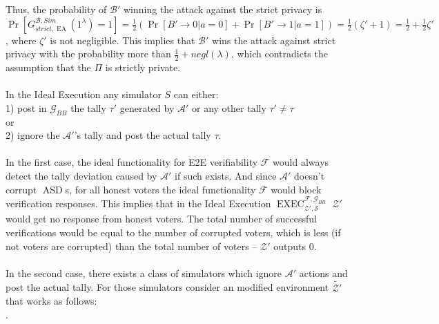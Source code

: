 \documentclass[12pt]{article}
\DeclareMathOperator{\exec}{EXEC}
\DeclareMathOperator{\asd}{ASD}
\DeclareMathOperator{\ea}{EA}
\begin{document}
%
Thus, the probability of $\mathcal{B'}$  winning the attack against the strict privacy is \\$\Pr[G_{strict,\ea}^{\mathcal{B}, Sim}(1^{\lambda})=1]= \frac{1}{2}(\Pr[B'\rightarrow 0| a=0] + \Pr[B'\rightarrow 1| a=1])  = \frac{1}{2} (\zeta' +1) =  \frac{1}{2}  +  \frac{1}{2} \zeta'$ , where $\zeta'$ is not negligible. This implies that $\mathcal{B'}$ wins the attack against strict privacy with the probability more than $\frac{1}{2} + negl(\lambda)$, which contradicts the assumption that the $\Pi$ is strictly private.\\\\
In the Ideal Execution any simulator $S$ can either:\\
1) post in $\mathcal{G}_{BB}$ the tally $\tau'$ generated by $\mathcal{A'}$ or any other tally  $\tau' \neq \tau$\\ 
or\\
2) ignore the $\mathcal{A'}$'s tally and post the actual tally $\tau$.\\\\
In the first case, the ideal functionality for E2E verifiability  $\mathcal{F}$  would always detect the tally deviation caused by $\mathcal{A'}$ if such exists. And since  $\mathcal{A'}$ doesn't corrupt $\asd$s, for all honest voters the ideal functionality $\mathcal{F}$ would block verification responses. This implies that in the Ideal Execution $\exec_{\mathcal{Z'}, \mathcal{S}}^{\mathcal{F}, \mathcal{G}_{BB}}$ $\mathcal{Z'}$ would get no response from honest voters. The total number of successful verifications would be equal to the number of corrupted voters, which is less (if not voters are corrupted) than the total number of voters -- $\mathcal{Z'}$ outputs 0.  \\\\
In the second case, there exists a class of simulators which ignore $\mathcal{A'}$ actions and post the actual tally.  For those simulators consider an modified  environment $\tilde{\mathcal{Z'}}$ that works as follows:\\
.
\end{document}
